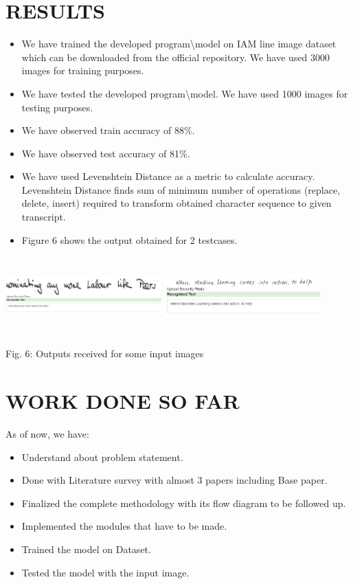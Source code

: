 \documentclass[12pt, conference]{IEEEtran}
\begin{document}
\section{\textbf{RESULTS}}
\begin{itemize}
    \item We have trained the developed program\textbackslash model on IAM line image dataset which can be downloaded from the official repository. We have used 3000 images for training purposes.
    \item We have tested the developed program\textbackslash model. We have used 1000 images for testing purposes.
    \item We have observed train accuracy of 88\%.
    \item We have observed test accuracy of 81\%.
    \item We have used Levenshtein Distance as a metric to calculate accuracy. Levenshtein Distance finds sum of minimum number of operations (replace, delete, insert) required to transform obtained character sequence to given transcript.
    \item Figure 6 shows the output obtained for 2 testcases.
\end{itemize}
\includegraphics[width=0.45\textwidth, height=3cm]{img8.jpg}
\includegraphics[width=0.45\textwidth, height=3cm]{img9.jpg}
\begin{center}
    Fig. 6: Outputs received for some input images
\end{center}

\section{\textbf{WORK DONE SO FAR}}
As of now, we have:
\begin{itemize}
    \item Understand about problem statement.
    \item Done with Literature survey with almost 3 papers including Base paper.
    \item Finalized the complete methodology with its flow diagram to be followed up.
    \item Implemented the modules that have to be made.
    \item Trained the model on Dataset.
    \item Tested the model with the input image.
\end{itemize}
\end{document}
